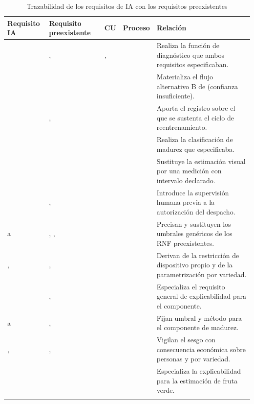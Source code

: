 \begin{longtable}{|C{1.9cm}|C{2.2cm}|C{1.5cm}|C{1.5cm}|L{6.4cm}|}
\hline
{}\textbf{Requisito IA} & \textbf{Requisito preexistente} & \textbf{CU} & \textbf{Proceso} & \textbf{Relación}\\ \hline
\endhead
{} & ,  & ,  &  & Realiza la función de diagnóstico que ambos requisitos especificaban.\\ \hline
{} &  &  &  & Materializa el flujo alternativo B de  (confianza insuficiente).\\ \hline
{} & ,  &  &  & Aporta el registro sobre el que se sustenta el ciclo de reentrenamiento.\\ \hline
{} &  &  &  & Realiza la clasificación de madurez que  especificaba.\\ \hline
{} &  &  &  & Sustituye la estimación visual por una medición con intervalo declarado.\\ \hline
{} & ,  &  &  & Introduce la supervisión humana previa a la autorización del despacho.\\ \hline
{} a  & , ,  &  &  & Precisan y sustituyen los umbrales genéricos de los RNF preexistentes.\\ \hline
{},  & ,  &  &  & Derivan de la restricción de dispositivo propio y de la parametrización por variedad.\\ \hline
{} & ,  &  &  & Especializa el requisito general de explicabilidad para el componente.\\ \hline
{} a  & ,  &  &  & Fijan umbral y método para el componente de madurez.\\ \hline
{},  & ,  &  &  & Vigilan el sesgo con consecuencia económica sobre personas y por variedad.\\ \hline
{} &  &  &  & Especializa la explicabilidad para la estimación de fruta verde.\\ \hline
\caption{Trazabilidad de los requisitos de IA con los requisitos preexistentes}
\label{tab:traza-ia}
\end{longtable}

